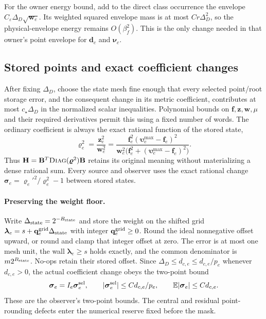 \documentclass[11pt]{article}
\theoremstyle{remark}
\newcommand{\BB}{\mathbf B}
\newcommand{\HH}{\mathbf H}
\newcommand{\ff}{\mathbf f}
\newcommand{\llambda}{\boldsymbol{\lambda}}
\newcommand{\ww}{\mathbf w}
\newcommand{\zz}{\mathbf z}
\newcommand{\vvr}{\boldsymbol{\varrho}}
\newcommand{\vvu}{\boldsymbol{\upsilon}}
\newcommand{\ssigma}{\boldsymbol{\sigma}}
\newcommand{\qq}{\mathbf q}
\newcommand{\dd}{\mathbf d}
\newcommand{\nnu}{\boldsymbol{\nu}}
\newcommand{\diag}{\textsc{Diag}}
\newcommand{\Ex}{\mathbb E}
\begin{document}
For the owner energy bound, add to the direct class occurrence the envelope
$C_\varepsilon\Delta_D\sqrt{\ww_e}$.
Its weighted squared envelope mass is at most $Cr\Delta_D^2$, so the
physical-envelope energy remains $O(\beta_f^2)$.
This is the only change needed in that owner's point envelope for $\dd_c$ and
$\nnu_c$.

\subsection{Stored points and exact coefficient changes}

After fixing $\Delta_D$, choose the state mesh fine enough that every selected
point/root storage error, and the consequent change in its metric coefficient,
contributes at most $c_\star\Delta_D$ in the normalized scalar inequalities.
Polynomial bounds on $\ff,\zz,\ww,\mu$ and their required derivatives permit this
using a fixed number of words.
The ordinary coefficient is always the exact rational function of the stored
state,
\[
 \vvr_e^2=\frac{\zz_e^2}{\ww_e^2}
 =\frac{\ff_e^2(\vvu_e^{\max}-\ff_e)^2}
 {\ww_e^2\bigl(\ff_e^2+(\vvu_e^{\max}-\ff_e)^2\bigr)}.
\]
Thus $\HH=\BB^T\diag(\vvr^2)\BB$ retains its original meaning without materializing a
dense rational sum.
Every source and observer uses the exact rational change $\ssigma_e=\vvr_e'^2/\vvr_e^2-1$
between stored states.

\paragraph{Preserving the weight floor.}
Write $\Delta_{\rm state}=2^{-B_{\rm state}}$ and store the weight on the
shifted grid $\llambda_e=s+\qq_e^{\rm grid}\Delta_{\rm state}$ with integer
$\qq_e^{\rm grid}\ge0$.
Round the ideal nonnegative offset upward, or round and clamp that integer
offset at zero.
The error is at most one mesh unit, the wall $\llambda_e\ge s$ holds exactly, and
the common denominator is $m2^{B_{\rm state}}$.
No-ops retain their stored offset.
Since $\Delta_D\le d_{c,e}\le d_{c,e}/p_e$ whenever $d_{c,e}>0$, the actual
coefficient change obeys the two-point bound
\[
 \ssigma_e=I_e \ssigma_e^{\rm sel},\qquad
 |\ssigma_e^{\rm sel}|\le C d_{c,e}/p_e,
 \qquad \Ex|\ssigma_e|\le C d_{c,e}.
\]
These are the observer's two-point bounds.
The central and residual point-rounding defects enter the numerical reserve
fixed before the mask.
\end{document}
